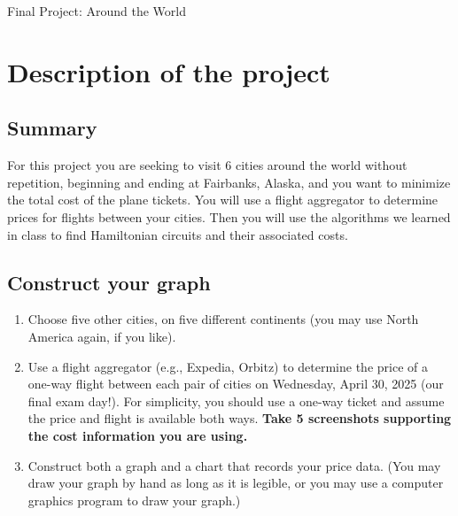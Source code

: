 \documentclass[12pt]{article}
\begin{document}



{\Large
\begin{center}
 {\sc Final Project: Around the World} %
\end{center}
}

\section{Description of the project}

\subsection*{Summary} For this project you are seeking to visit 6 cities around the world without repetition, beginning and ending at Fairbanks, Alaska, and you want to minimize the total cost of the plane tickets. You will use a flight aggregator to determine prices for flights between your cities. Then you will use the algorithms we learned in class to find Hamiltonian circuits and their associated costs.  

\subsection*{Construct your graph}

\begin{enumerate}
\item Choose five other cities, on five different continents (you may use North America again, if you like).
\item Use a flight aggregator (e.g., Expedia, Orbitz) to determine the price of a one-way flight between each pair of cities on Wednesday, April 30, 2025 (our final exam day!). For simplicity, you should use a one-way ticket and assume the price and flight is available both ways. \textbf{Take 5 screenshots supporting the cost information you are using.}
\item Construct both a graph and a chart that records your price data. (You may draw your graph by hand as long as it is legible, or you may use a computer graphics program to draw your graph.)
\end{enumerate} 
\end{document}
